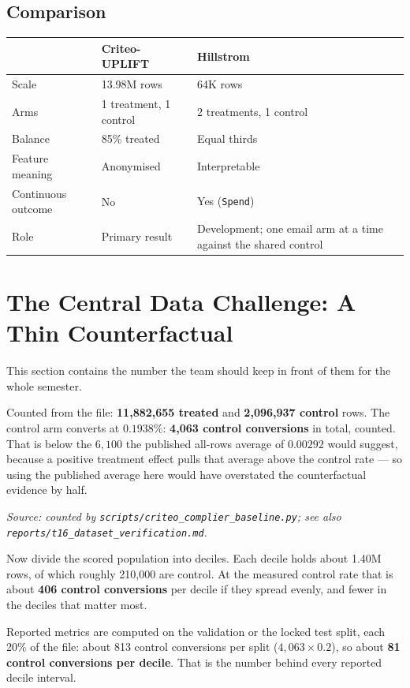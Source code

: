 \documentclass[11pt,a4paper]{article}
\newcommand{\srcnote}[1]{{\footnotesize\itshape\color{teal}Source: #1}}
\begin{document}
\subsection{Comparison}

\begin{tabularx}{\textwidth}{@{}L{3.4cm}XX@{}}
\toprule
& \textbf{Criteo-UPLIFT} & \textbf{Hillstrom} \\
\midrule
Scale & 13.98M rows & 64K rows \\
Arms & 1 treatment, 1 control & 2 treatments, 1 control \\
Balance & 85\% treated & Equal thirds \\
Feature meaning & Anonymised & Interpretable \\
Continuous outcome & No & Yes (\texttt{Spend}) \\
Role & Primary result & Development; one email arm at a time against the shared control \\
\bottomrule
\end{tabularx}

\section{The Central Data Challenge: A Thin Counterfactual}
\label{sec:thin}

\begin{alertbox}
This section contains the number the team should keep in front of them for the whole semester.
\end{alertbox}

Counted from the file: \textbf{11{,}882{,}655 treated} and \textbf{2{,}096{,}937 control} rows. The
control arm converts at $0.1938\%$: \textbf{4{,}063 control conversions} in total, counted.
That is below the $6{,}100$ the published all-rows average of $0.00292$ would suggest, because a
positive treatment effect pulls that average above the control rate --- so using the published
average here would have overstated the counterfactual evidence by half.

\srcnote{counted by \texttt{scripts/criteo\_complier\_baseline.py}; see also
\texttt{reports/t16\_dataset\_verification.md}.}

Now divide the scored population into deciles. Each decile holds about 1.40M rows, of which roughly
210{,}000 are control. At the measured control rate that is about \textbf{406 control
conversions} per decile if they spread evenly, and fewer in the deciles that matter most.

Reported metrics are computed on the validation or the locked test split, each 20\% of the file:
about 813 control conversions per split ($4{,}063 \times 0.2$), so about \textbf{81 control
conversions per decile}. That is the number behind every reported decile interval.
\end{document}
